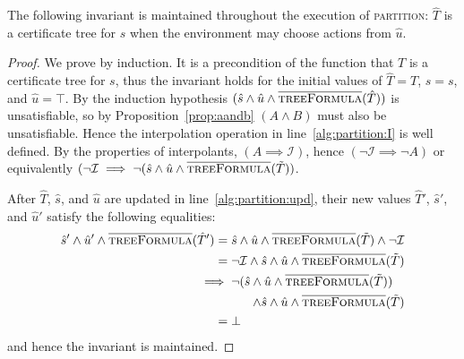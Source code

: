 \begin{proposition}
    The following invariant is maintained throughout the execution of \textsc{partition}: $\hat{T}$ is a certificate tree for $\hat{s}$ when the environment may choose actions from $\hat{u}$.
\end{proposition}
\begin{proof}
    We prove by induction. It is a precondition of the function that $T$ is a certificate tree for $s$, thus the invariant holds for the initial values of $\hat{T} = T$, $\hat{s} = s$, and $\hat{u} = \top$.  By the induction hypothesis $(\hat{s} \land \hat{u} \land \textsc{$\overline{\mbox{treeFormula}}$}(\hat{T}))$ is unsatisfiable, so by Proposition~\ref{prop:aandb} $(A \land B)$ must also be unsatisfiable.  Hence the interpolation operation in line~\ref{alg:partition:I} is well defined.  By the properties of interpolants, $(A \implies \mathcal{I})$, hence $(\neg \mathcal{I} \implies \neg A)$ or equivalently $(\neg\mathcal{I} \implies \neg (\hat{s} \land \hat{u} \land \textsc{$\overline{\mbox{treeFormula}}$}(\tilde{T}))$.

    After $\hat{T}$, $\hat{s}$, and $\hat{u}$ are updated in line~\ref{alg:partition:upd}, their new values $\hat{T}'$, $\hat{s}'$, and $\hat{u}'$ satisfy the following equalities: \begin{align*}
        \hat{s}' \land \hat{u}' \land \opptf(\hat{T}') ={}& \hat{s} \land \hat{u} \land \opptf(\tilde{T}) \land \neg\mathcal{I} \\
        ={}& \neg\mathcal{I} \land \hat{s} \land \hat{u} \land \opptf(\tilde{T}) \\
        \implies{}& \neg (\hat{s} \land \hat{u} \land \opptf(\tilde{T})) \\
                  & \pushright{\land \hat{s} \land \hat{u} \land \opptf(\tilde{T})} \\
        ={}& \bot
\end{align*} and hence the invariant is maintained.
\end{proof}

